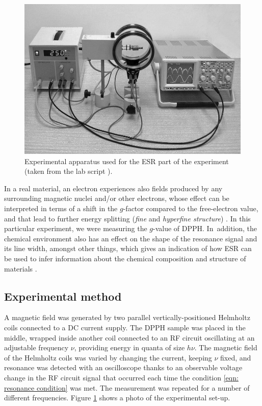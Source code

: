 \documentclass[a4paper]{jpconf}
\numberwithin{equation}{section}
\begin{document}
\begin{figure}[t!]
	\includegraphics[scale=0.4]{apparatus.png}
	\hspace{2pc}
	\begin{minipage}[b]{2in}
		\caption{Experimental apparatus used for the ESR part of the experiment (taken from the lab script \cite{MacLaren}).}
		\label{fig: apparatus}
	\end{minipage}
\end{figure}

In a real material, an electron experiences also fields produced by any surrounding magnetic nuclei and/or other electrons, whose effect can be interpreted in terms of a shift in the $g$-factor compared to the free-electron value, and that lead to further energy splitting (\emph{fine} and \emph{hyperfine structure}) \cite{Lancaster, Ball}. In this particular experiment, we were measuring the $g$-value of DPPH. In~addition, the chemical environment also has an effect on the shape of the resonance signal and its line width, amongst other things, which gives an indication of how ESR can be used to infer information about the chemical composition and structure of materials \cite{Lancaster}. 

\subsection{Experimental method}\label{section: method}
A magnetic field was generated by two parallel vertically-positioned Helmholtz coils connected to a DC current supply. The DPPH sample was placed in the middle, wrapped inside another coil connected to an RF circuit oscillating at an adjustable frequency $\nu$, providing energy in quanta of size $h\nu$. The magnetic field of the Helmholtz coils was varied by changing the current, keeping $\nu$ fixed, and resonance was detected with an oscilloscope thanks to an observable voltage change in the RF circuit signal that occurred each time the condition \eqref{eqn: resonance condition} was met. The measurement was repeated for a number of different frequencies. Figure \ref{fig: apparatus} shows a photo of the experimental set-up.
\end{document}
